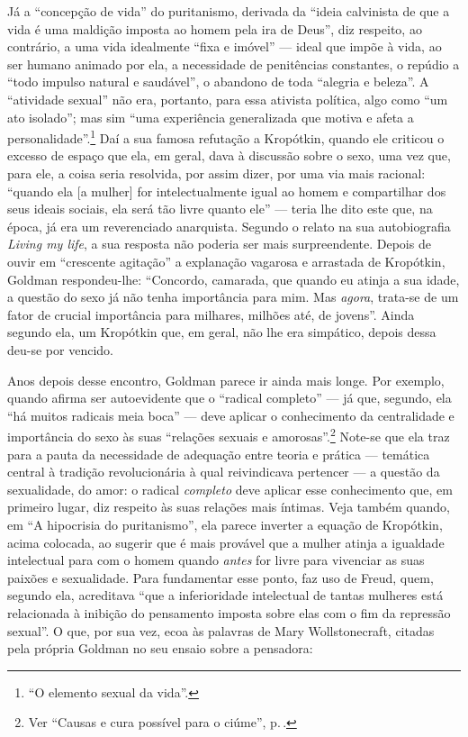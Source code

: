 Já a ``concepção de vida'' do
puritanismo, derivada da ``ideia calvinista de que a vida é uma maldição
imposta ao homem pela ira de Deus'', diz respeito, ao contrário, a uma
vida idealmente ``fixa e imóvel'' --- ideal que impõe à vida, ao
ser humano animado por ela, a necessidade de penitências constantes, o
repúdio a ``todo impulso natural e saudável'', o abandono de toda
``alegria e beleza''. A ``atividade sexual'' não era, portanto, para
essa ativista política, algo como ``um ato isolado''; mas sim ``uma
experiência generalizada que motiva e afeta a personalidade''.\footnote{``O
elemento sexual da vida''.} Daí a sua famosa refutação a Kropótkin,
quando ele criticou o excesso de espaço que ela, em geral, dava à
discussão sobre o sexo, uma vez que, para ele, a coisa seria resolvida,
por assim dizer, por uma via mais racional: ``quando ela {[}a mulher{]}
for intelectualmente igual ao homem e compartilhar dos seus ideais
sociais, ela será tão livre quanto ele'' --- teria lhe dito este que, na
época, já era um reverenciado anarquista. Segundo o relato na sua
autobiografia \emph{Living my life}, a sua resposta não poderia ser mais
surpreendente. Depois de ouvir em ``crescente agitação'' a explanação
vagarosa e arrastada de Kropótkin, Goldman respondeu-lhe: ``Concordo,
camarada, que quando eu atinja a sua idade, a questão do sexo já não
tenha importância para mim. Mas \emph{agora}, trata-se de um fator de
crucial importância para milhares, milhões até, de jovens''. Ainda
segundo ela, um Kropótkin que, em geral, não lhe era simpático, depois
dessa deu-se por vencido.

Anos depois desse encontro, Goldman parece
ir ainda mais longe. Por exemplo, quando afirma
ser autoevidente que o ``radical completo'' ---
já que, segundo, ela ``há muitos radicais meia boca'' --- deve aplicar o
conhecimento da centralidade e importância do sexo às suas ``relações
sexuais e amorosas''.\footnote{Ver ``Causas e cura
possível para o ciúme'', p.\,\pageref{radical}.} Note-se que ela traz para a pauta da
necessidade de adequação entre teoria e prática --- temática central à
tradição revolucionária à qual reivindicava pertencer --- a questão
da sexualidade, do amor: o radical \emph{completo} deve aplicar esse
conhecimento que, em primeiro lugar, diz respeito às suas relações mais
íntimas. Veja também quando, em ``A hipocrisia do puritanismo'', ela
parece inverter a equação de Kropótkin, acima colocada, ao sugerir que é
mais provável que a mulher atinja a igualdade intelectual para com o
homem quando \emph{antes} for livre para vivenciar as suas paixões e
sexualidade. Para fundamentar esse ponto, faz uso de Freud, quem,
segundo ela, acreditava ``que a inferioridade intelectual de tantas
mulheres está relacionada à inibição do pensamento imposta sobre elas
com o fim da repressão sexual''. O que, por sua vez, ecoa às palavras de
Mary Wollstonecraft, citadas pela própria Goldman no seu ensaio sobre a
pensadora:

